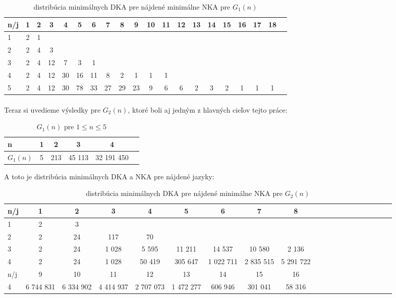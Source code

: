 \begin{table}[h]
  \centering
  \begin{tabular}{|l|c|c|c|c|c|c|c|c|c|c|c|c|c|c|c|c|c|c|r|}
    \hline
    n/j & 1 & 2 & 3 & 4 & 5 & 6 & 7 & 8 & 9 & 10 & 11 & 12 & 13 & 14 & 15 & 16 & 17 & 18 \\ 
    \hline
    1 & 2 & 1 & & & & & & & & & & & & & & & &\\ 
    \hline
    2 & 2 & 4 & 3 & & & & & & & & & & & & & & &\\
    \hline
    3 & 2 & 4 & 12 & 7 & 3 & 1 & & & & & & & & & & & &\\
    \hline
    4 & 2 & 4 & 12 & 30 & 16 & 11 & 8 & 2 & 1 & 1 & 1 & & & & & & &\\
    \hline
    5 & 2 & 4 & 12 & 30 & 78 & 33 & 27 & 29 & 23 & 9 & 6 & 6 & 2 & 3 & 2 & 1 & 1 & 1 \\
    \hline
  \end{tabular}
  \caption{distribúcia minimálnych DKA pre nájdené minimálne NKA pre $G_1(n)$}
  \label{tab:G1n}
\end{table}

\paragraph{}
Teraz si uvedieme výsledky pre $G_2(n)$, ktoré boli aj jedným z hlavných cieľov tejto práce:

\begin{table}[h]
  \centering
  \begin{tabular}{|l|c|c|c|c|r|}
    \hline
    n & 1 & 2 & 3 & 4 \\ 
    \hline
    $G_1(n)$ & 5 & 213 & 45 113 & 32 191 450 \\ 
    \hline
  \end{tabular}
  \caption{$G_1(n)$ pre $1 \leq n \leq 5$}
  \label{tab:G1n}
\end{table}

A toto je distribúcia minimálnych DKA a NKA pre nájdené jazyky:

\begin{table}[h]
  \centering
  \begin{tabular}{|l|c|c|c|c|c|c|c|c|c|c|c|c|c|c|c|c|c|c|r|}
    \hline
    n/j & 1 & 2 & 3 & 4 & 5 & 6 & 7 & 8 \\ 
    \hline
    1 & 2 & 3 & & & & & &\\ 
    \hline
    2 & 2 & 24 & 117 & 70 & & & &\\
    \hline
    3 & 2 & 24 & 1 028 & 5 595 & 11 211 & 14 537 & 10 580 & 2 136\\
    \hline
    4 & 2 & 24 & 1 028 & 50 419 & 305 647 & 1 022 711 & 2 835 515 & 5 291 722 \\
    \hline
    n/j & 9 & 10 & 11 & 12 & 13 & 14 & 15 & 16 \\
    \hline
    4 & 6 744 831 & 6 334 902 & 4 414 937 & 2 707 073 & 1 472 277 & 606 946 & 301 041 & 58 316\\
    \hline
  \end{tabular}
  \caption{distribúcia minimálnych DKA pre nájdené minimálne NKA pre $G_2(n)$}
  \label{tab:G1n}
\end{table}

